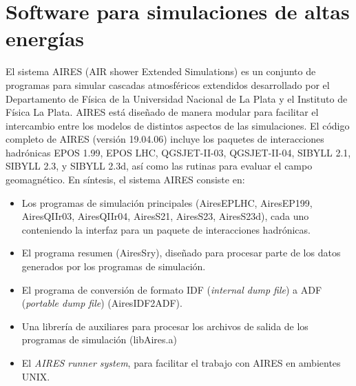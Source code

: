 \section{Software para simulaciones de altas energías}
El sistema AIRES (AIR shower Extended Simulations) es un conjunto de programas para simular cascadas atmosféricos extendidos desarrollado por el Departamento de Física de la Universidad Nacional de La Plata y el Instituto de Física La Plata. AIRES está diseñado de manera modular para facilitar el intercambio entre los modelos de distintos aspectos de las simulaciones. El código completo de AIRES (versi\'on 19.04.06) incluye los paquetes de interacciones hadrónicas EPOS 1.99, EPOS LHC, QGSJET-II-03, QGSJET-II-04, SIBYLL 2.1, SIBYLL 2.3, y SIBYLL 2.3d, así como las rutinas para evaluar el campo geomagnético. En síntesis, el sistema AIRES consiste en:
	\begin{itemize}
	\item Los programas de simulación principales (AiresEPLHC, AiresEP199, AiresQIIr03, AiresQIIr04, AiresS21, AiresS23, AiresS23d), cada uno conteniendo la interfaz para un paquete de interacciones hadrónicas.
	\item El programa resumen (AiresSry), diseñado para procesar parte de los datos generados por los programas de simulación.
	\item El programa de conversión de formato IDF (\textit{internal dump file}) a ADF (\textit{portable dump file}) (AiresIDF2ADF).
	\item Una librería de auxiliares para procesar los archivos de salida de los programas de simulación (libAires.a)
	\item El \textit{AIRES runner system}, para facilitar el trabajo con AIRES en ambientes UNIX. 
	\end{itemize}
	

